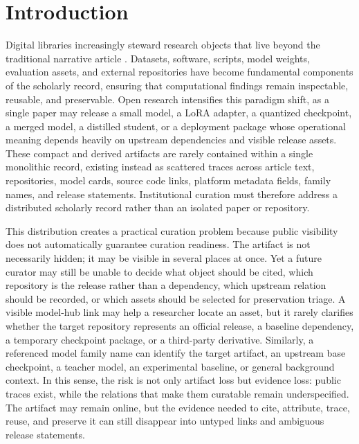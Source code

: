 \section{Introduction}

Digital libraries increasingly steward research objects that live beyond the traditional narrative article \cite{wilkinson2016fair,smith2016softwarecitation,barker2022fair4rs,soilandreyes2022rocrate}. Datasets, software, scripts, model weights, evaluation assets, and external repositories have become fundamental components of the scholarly record, ensuring that computational findings remain inspectable, reusable, and preservable. Open \llm research intensifies this paradigm shift, as a single paper may release a small model, a LoRA adapter, a quantized checkpoint, a merged model, a distilled student, or a deployment package whose operational meaning depends heavily on upstream dependencies and visible release assets. These compact and derived artifacts are rarely contained within a single monolithic record, existing instead as scattered traces across article text, \hf repositories, model cards, source code links, platform metadata fields, family names, and release statements. Institutional curation must therefore address a distributed scholarly record rather than an isolated paper or repository.

This distribution creates a practical curation problem because public visibility does not automatically guarantee curation readiness. The artifact is not necessarily hidden; it may be visible in several places at once. Yet a future curator may still be unable to decide what object should be cited, which repository is the release rather than a dependency, which upstream relation should be recorded, or which assets should be selected for preservation triage. A visible model-hub link may help a researcher locate an asset, but it rarely clarifies whether the target repository represents an official release, a baseline dependency, a temporary checkpoint package, or a third-party derivative. Similarly, a referenced model family name can identify the target artifact, an upstream base checkpoint, a teacher model, an experimental baseline, or general background context. In this sense, the risk is not only artifact loss but evidence loss: public traces exist, while the relations that make them curatable remain underspecified. The artifact may remain online, but the evidence needed to cite, attribute, trace, reuse, and preserve it can still disappear into untyped links and ambiguous release statements.

